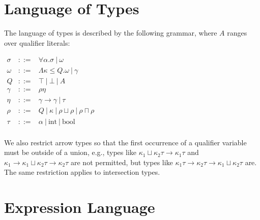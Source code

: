 \documentclass{article}
\begin{document}
\section{Language of Types}
The language of types is described by the following grammar, where $A$ ranges over qualifier literals:

\begin{math}
\begin{array}{rcl}
\sigma & ::= & \forall \alpha . \sigma\ |\ \omega \\

\omega & ::= & \Lambda \kappa \le Q . \omega\ |\ \gamma \\

Q & ::= & \top\ |\ \bot\ |\ A \\

\gamma & ::= & \rho \eta \\

\eta & ::= & \gamma \rightarrow \gamma\ |\ \tau \\

\rho & ::= & Q\ |\ \kappa\ |\ \rho \sqcup \rho\ |\ \rho \sqcap \rho \\

\tau & ::= & \alpha\ |\ \textrm{int}\ |\ \textrm{bool} \\

\end{array}
\end{math}

We also restrict arrow types so that the first occurrence of a qualifier variable must be outside of a union, e.g., types like ${\kappa}_1 \sqcup {\kappa}_2 \tau \rightarrow {\kappa}_1 \tau$ and ${\kappa}_1 \rightarrow {\kappa}_1 \sqcup {\kappa}_2 \tau \rightarrow {\kappa}_2 \tau$ are not permitted, but types like ${\kappa}_1 \tau \rightarrow {\kappa}_2 \tau \rightarrow {\kappa}_1 \sqcup {\kappa}_2 \tau$ are.
  The same restriction applies to intersection types.


\section{Expression Language}
\end{document}
